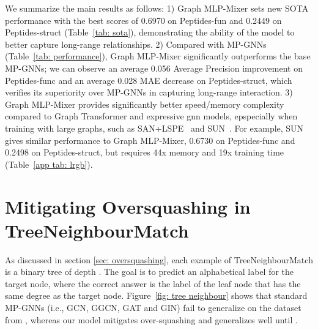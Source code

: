 \documentclass{article}
\begin{document}
We summarize the main results as follows: 1) Graph MLP-Mixer sets new SOTA performance with the best scores of 0.6970 on Peptides-fun and 0.2449 on Peptides-struct (Table~\ref{tab: sota}), demonstrating the ability of the model to better capture long-range relationships.
2) Compared with MP-GNNs (Table~\ref{tab: performance}), Graph MLP-Mixer significantly outperforms the base MP-GNNs; we can observe an average 0.056 Average Precision improvement on Peptides-func and an average 0.028 MAE decrease on Peptides-struct, which verifies its superiority over MP-GNNs in capturing long-range interaction.
3) Graph MLP-Mixer provides significantly better speed/memory complexity compared to Graph Transformer and expressive gnn models, epspecially when training with large graphs, such as SAN+LSPE~\citep{chen2022structure_SAT} and SUN~\citep{sun}. For example, SUN gives similar performance to Graph MLP-Mixer, 0.6730 on Peptides-func and 0.2498 on Peptides-struct, but requires 44x memory and 19x training time (Table~\ref{app tab: lrgb}). 




\section{Mitigating Oversquashing in TreeNeighbourMatch}\label{app_sec: oversquashing}

As discussed in section \ref{sec: oversquashing}, 
each example of TreeNeighbourMatch is a binary tree of depth . The goal is to predict an alphabetical label for the target node, where the correct answer is the label of the leaf node that has the same degree as the target node. Figure~\ref{fig: tree neighbour} shows that standard MP-GNNs (i.e., GCN, GGCN, GAT and GIN) fail to generalize on the dataset from , whereas
our model mitigates over-squashing and generalizes well until .
\end{document}
